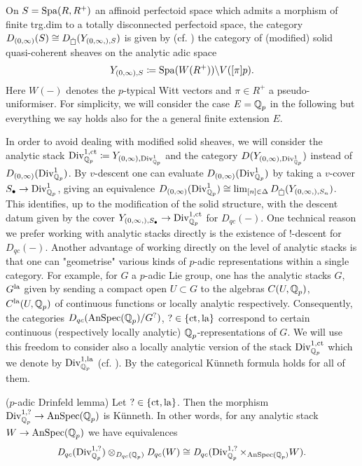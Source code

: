 On $S=\operatorname{Spa}(R,R^+)$ an affinoid perfectoid space which admits a morphism of finite trg.dim to a totally disconnected perfectoid space, the category $D_{(0,\infty)}(S)\cong D_{\hat{\operatorname{\square}}}(Y_{(0,\infty,),S})$ is given by (cf. \Cite[Theorem 1.2.1]{anschütz20246functorformalismsolidquasicoherent}) the category of (modified) solid quasi-coherent sheaves on the analytic adic space
\[
Y_{(0,\infty),S}\coloneqq \operatorname{Spa}(W(R^+))\backslash V([\pi]p).
\]
Here $W(-)$ denotes the $p$-typical Witt vectors and $\pi\in R^+$ a pseudo-uniformiser. For simplicity, we will consider the case $E=\operatorname{\mathbb{Q}}_p$ in the following but everything we say holds also for the a general finite extension $E$.

In order to avoid dealing with modified solid sheaves, we will consider the analytic stack $\operatorname{Div}_{\mathbb{Q}_p}^{1,\operatorname{ct}}\coloneqq Y_{(0,\infty),\operatorname{Div}^1_{\mathbb{Q}_p}}$ and the category $D(Y_{(0,\infty),\operatorname{Div}^1_{\mathbb{Q}_p}})$ instead of $D_{(0,\infty)}({\operatorname{Div}}^1_{\mathbb{Q}_p})$. By $v$-descent one can evaluate $D_{(0,\infty)}({\operatorname{Div}}^1_{\mathbb{Q}_p})$ by taking a  $v$-cover $S_{\bullet}\to {\operatorname{Div}}^1_{\mathbb{Q}_p}$, giving an equivalence  $D_{(0,\infty)}({\operatorname{Div}}^1_{\mathbb{Q}_p})\cong \lim_{[n]\in \Delta}D_{\hat{\operatorname{\square}}}(Y_{(0,\infty,),S_n})$. This identifies, up to the modification of the solid structure, with the descent datum  given by the cover $Y_{(0,\infty,),S_{\bullet}} \to \operatorname{Div}_{\mathbb{Q}_p}^{1,\operatorname{ct}}$ for $D_{qc}(-)$.  One technical reason we prefer working with analytic stacks directly is  the existence of $!$-descent for $D_{qc}(-)$. Another advantage of working directly on the level of analytic stacks is that one can  "geometrise" various kinds of $p$-adic representations within a single category. For example, for $G$ a $p$-adic Lie group, one has the analytic stacks $G$, $G^{\operatorname{la}}$  given by sending a compact open $U\subset G$ to the algebras $C(U,\operatorname{\mathbb{Q}}_p)$, $C^{\operatorname{la}}(U,\operatorname{\mathbb{Q}}_p)$ of continuous functions or locally analytic respectively. Consequently, the categories $D_{qc}(\operatorname{AnSpec}(\operatorname{\mathbb{Q}}_p) /G^?)$, $? \in \{ \operatorname{ct}, \operatorname{la}\}$ correspond to certain continuous (respectively locally analytic) $\operatorname{\mathbb{Q}}_p$-representations of $G$.   We will use this freedom to consider also a locally analytic version of the stack $\operatorname{Div}_{\mathbb{Q}_p}^{1,\operatorname{ct}}$ which we denote by $\operatorname{Div}_{\mathbb{Q}_p}^{1,\operatorname{la}}$ (cf. ). By  the categorical Künneth formula holds for all of them. 
\begin{corollary}($p$-adic Drinfeld lemma)
    Let $? \in \{\operatorname{ct},\operatorname{la} \}$. Then the morphism $\operatorname{Div}_{\operatorname{\mathbb{Q}}_p}^{1,?}\to \operatorname{AnSpec}(\operatorname{\mathbb{Q}}_p)$ is Künneth. In other words, for any analytic stack $W \to \operatorname{AnSpec}(\operatorname{\mathbb{Q}}_p)$ we have equivalences
    \[
    \mathit{D}_{qc}(\operatorname{Div}_{\operatorname{\mathbb{Q}}_p}^{1,?})\otimes_{\mathit{D}_{qc}(\operatorname{\mathbb{Q}}_p)}  \mathit{D}_{qc}(W) \cong \mathit{D}_{qc}( \operatorname{Div}_{\operatorname{\mathbb{Q}}_p}^{1,?} \times_{\operatorname{AnSpec}(\operatorname{\mathbb{Q}}_p)}W).
    \]
\end{corollary}

